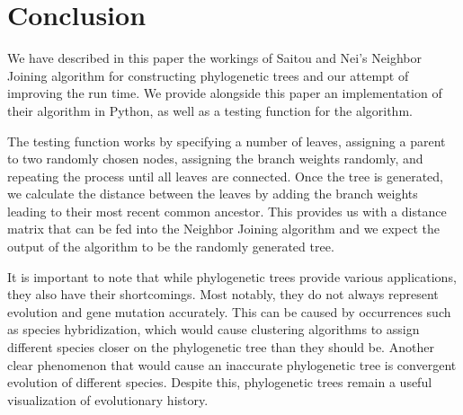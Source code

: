 \section{Conclusion}


We have described in this paper the workings of Saitou and Nei's Neighbor Joining algorithm for constructing phylogenetic trees and our attempt of improving the run time. We provide alongside this paper an implementation of their algorithm in Python, as well as a testing function for the algorithm. 

The testing function works by specifying a number of leaves, assigning a parent to two randomly chosen nodes, assigning the branch weights randomly, and repeating the process until all leaves are connected. Once the tree is generated, we calculate the distance between the leaves by adding the branch weights leading to their most recent common ancestor. This provides us with a distance matrix that can be fed into the Neighbor Joining algorithm and we expect the output of the algorithm to be the randomly generated tree.

It is important to note that while phylogenetic trees provide various applications, they also have their shortcomings. Most notably, they do not always represent evolution and gene mutation accurately. This can be caused by occurrences such as species hybridization, which would cause clustering algorithms to assign different species closer on the phylogenetic tree than they should be. Another clear phenomenon that would cause an inaccurate phylogenetic tree is convergent evolution of different species. Despite this, phylogenetic trees remain a useful visualization of evolutionary history.

